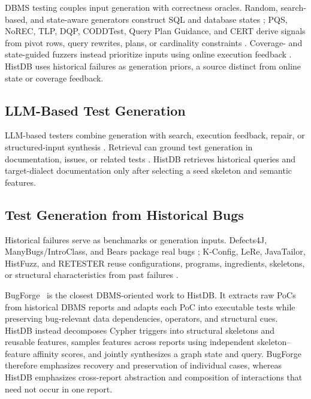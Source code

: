 \documentclass[acmsmall,screen,anonymous]{acmart}
\begin{document}
DBMS testing couples input generation with correctness oracles. Random, search-based, and state-aware generators construct SQL and database states \cite{ref34,ref35,ref36,ref37}; PQS, NoREC, TLP, DQP, CODDTest, Query Plan Guidance, and CERT derive signals from pivot rows, query rewrites, plans, or cardinality constraints \cite{ref13,ref14,ref15,ref16,ref20,ref38,ref39}. Coverage- and state-guided fuzzers instead prioritize inputs using online execution feedback \cite{ref18,ref19,ref46,ref47,ref48}. HistDB uses historical failures as generation priors, a source distinct from online state or coverage feedback.

\subsection{LLM-Based Test Generation}

LLM-based testers combine generation with search, execution feedback, repair, or structured-input synthesis \cite{ref21,ref22,ref23,ref49,ref50,ref53,ref51,ref52}. Retrieval can ground test generation in documentation, issues, or related tests \cite{ref11,ref12,ref24}. HistDB retrieves historical queries and target-dialect documentation only after selecting a seed skeleton and semantic features.

\subsection{Test Generation from Historical Bugs}

Historical failures serve as benchmarks or generation inputs. Defects4J, ManyBugs/IntroClass, and Bears package real bugs \cite{ref54,ref55,ref56}; K-Config, LeRe, JavaTailor, HistFuzz, and RETESTER reuse configurations, programs, ingredients, skeletons, or structural characteristics from past failures \cite{ref25,ref26,refJavaTailor,refHistFuzz,ref27}.

BugForge~\cite{refBugForge} is the closest DBMS-oriented work to HistDB. It extracts raw PoCs from historical DBMS reports and adapts each PoC into executable tests while preserving bug-relevant data dependencies, operators, and structural cues. HistDB instead decomposes Cypher triggers into structural skeletons and reusable features, samples features across reports using independent skeleton--feature affinity scores, and jointly synthesizes a graph state and query. BugForge therefore emphasizes recovery and preservation of individual cases, whereas HistDB emphasizes cross-report abstraction and composition of interactions that need not occur in one report.
\end{document}
